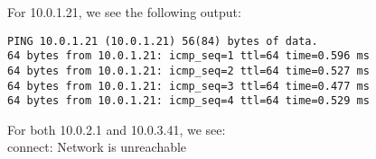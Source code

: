 For 10.0.1.21, we see the following output:

\begin{lstlisting}
PING 10.0.1.21 (10.0.1.21) 56(84) bytes of data.
64 bytes from 10.0.1.21: icmp_seq=1 ttl=64 time=0.596 ms
64 bytes from 10.0.1.21: icmp_seq=2 ttl=64 time=0.527 ms
64 bytes from 10.0.1.21: icmp_seq=3 ttl=64 time=0.477 ms
64 bytes from 10.0.1.21: icmp_seq=4 ttl=64 time=0.529 ms
\end{lstlisting}
For both 10.0.2.1 and 10.0.3.41, we see:\\

connect: Network is unreachable
